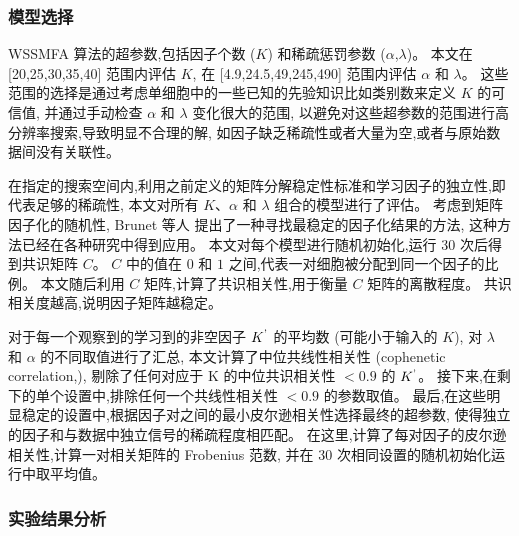 \subsubsection{模型选择}
WSSMFA 算法的超参数,包括因子个数 ($K$) 和稀疏惩罚参数 ($\alpha$,$\lambda$)。
本文在 [20,25,30,35,40] 范围内评估 $K$, 在 [4.9,24.5,49,245,490] 范围内评估 $\alpha$ 和 $\lambda$。
这些范围的选择是通过考虑单细胞中的一些已知的先验知识比如类别数来定义 $K$ 的可信值,
并通过手动检查 $\alpha$ 和 $\lambda$ 变化很大的范围,
以避免对这些超参数的范围进行高分辨率搜索,导致明显不合理的解,
如因子缺乏稀疏性或者大量为空,或者与原始数据间没有关联性。

在指定的搜索空间内,利用之前定义的矩阵分解稳定性标准和学习因子的独立性,即代表足够的稀疏性,
本文对所有 $K$、$\alpha$ 和 $\lambda$ 组合的模型进行了评估。
考虑到矩阵因子化的随机性, Brunet 等人  提出了一种寻找最稳定的因子化结果的方法,
这种方法已经在各种研究中得到应用。
本文对每个模型进行随机初始化,运行 30 次后得到共识矩阵 $C$。
$C$ 中的值在 $0$ 和 $1$ 之间,代表一对细胞被分配到同一个因子的比例。
本文随后利用 $C$ 矩阵,计算了共识相关性,用于衡量 $C$ 矩阵的离散程度。
共识相关度越高,说明因子矩阵越稳定。

对于每一个观察到的学习到的非空因子 $K^\textup{'}$ 的平均数 (可能小于输入的 $K$),
对 $\lambda$ 和 $\alpha$ 的不同取值进行了汇总,
本文计算了中位共线性相关性 (cophenetic correlation,),
剔除了任何对应于 K 的中位共识相关性 $< 0.9$ 的 $K^\textup{'}$。
接下来,在剩下的单个设置中,排除任何一个共线性相关性 $< 0.9$ 的参数取值。
最后,在这些明显稳定的设置中,根据因子对之间的最小皮尔逊相关性选择最终的超参数,
使得独立的因子和与数据中独立信号的稀疏程度相匹配。
在这里,计算了每对因子的皮尔逊相关性,计算一对相关矩阵的 Frobenius 范数, 
并在 30 次相同设置的随机初始化运行中取平均值。

\subsubsection{实验结果分析}


